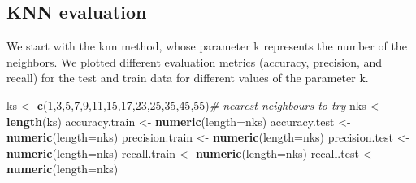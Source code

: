 \documentclass[
]{article}
\newenvironment{Shaded}{\begin{snugshade}}{\end{snugshade}}
\newcommand{\CommentTok}[1]{\textcolor[rgb]{0.56,0.35,0.01}{\textit{#1}}}
\newcommand{\DataTypeTok}[1]{\textcolor[rgb]{0.13,0.29,0.53}{#1}}
\newcommand{\DecValTok}[1]{\textcolor[rgb]{0.00,0.00,0.81}{#1}}
\newcommand{\KeywordTok}[1]{\textcolor[rgb]{0.13,0.29,0.53}{\textbf{#1}}}
\newcommand{\NormalTok}[1]{#1}
\newcommand{\StringTok}[1]{\textcolor[rgb]{0.31,0.60,0.02}{#1}}
\begin{document}
\hypertarget{knn-evaluation}{%
\subsection{KNN evaluation}\label{knn-evaluation}}

We start with the knn method, whose parameter k represents the number of
the neighbors. We plotted different evaluation metrics (accuracy,
precision, and recall) for the test and train data for different values
of the parameter k.

\begin{Shaded}
\begin{Highlighting}[]
\NormalTok{ks <-}\StringTok{ }\KeywordTok{c}\NormalTok{(}\DecValTok{1}\NormalTok{,}\DecValTok{3}\NormalTok{,}\DecValTok{5}\NormalTok{,}\DecValTok{7}\NormalTok{,}\DecValTok{9}\NormalTok{,}\DecValTok{11}\NormalTok{,}\DecValTok{15}\NormalTok{,}\DecValTok{17}\NormalTok{,}\DecValTok{23}\NormalTok{,}\DecValTok{25}\NormalTok{,}\DecValTok{35}\NormalTok{,}\DecValTok{45}\NormalTok{,}\DecValTok{55}\NormalTok{)}\CommentTok{# nearest neighbours to try}
\NormalTok{nks <-}\StringTok{ }\KeywordTok{length}\NormalTok{(ks)}
\NormalTok{accuracy.train <-}\StringTok{ }\KeywordTok{numeric}\NormalTok{(}\DataTypeTok{length=}\NormalTok{nks)}
\NormalTok{accuracy.test <-}\StringTok{ }\KeywordTok{numeric}\NormalTok{(}\DataTypeTok{length=}\NormalTok{nks)}
\NormalTok{precision.train <-}\StringTok{ }\KeywordTok{numeric}\NormalTok{(}\DataTypeTok{length=}\NormalTok{nks)}
\NormalTok{precision.test <-}\StringTok{ }\KeywordTok{numeric}\NormalTok{(}\DataTypeTok{length=}\NormalTok{nks)}
\NormalTok{recall.train <-}\StringTok{ }\KeywordTok{numeric}\NormalTok{(}\DataTypeTok{length=}\NormalTok{nks)}
\NormalTok{recall.test <-}\StringTok{ }\KeywordTok{numeric}\NormalTok{(}\DataTypeTok{length=}\NormalTok{nks)}
\end{Highlighting}
\end{Shaded}
\end{document}
